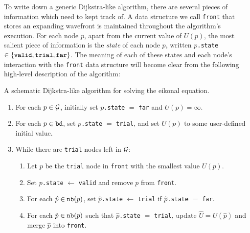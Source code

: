 \documentclass[eikonal.tex]{subfiles}
\begin{document}
To write down a generic Dijkstra-like algorithm, there are several
pieces of information which need to kept track of. A data structure we
call \texttt{front} that stores an expanding wavefront is maintained
throughout the algorithm's execution. For each node $p$, apart from
the current value of $U(p)$, the most salient piece of information is
the \emph{state} of each node $p$, written $p$\texttt{.state}
$\in \left\{\texttt{valid}, \texttt{trial}, \texttt{far}\right\}$. The meaning
of each of these states and each node's interaction with the
\texttt{front} data structure will become clear from the following
high-level description of the algorithm:

\begin{algorithm}
  \caption{A schematic Dijkstra-like algorithm for solving the eikonal
    equation.}\label{alg:dijkstra-like}
  \begin{enumerate}[nolistsep]
  \item For each $p \in \mathcal{G}$, initially set $p$\texttt{.state} $=$
    \texttt{far} and $U(p) = \infty$.
  \item For each $p \in \texttt{bd}$, set $p$\texttt{.state} $=$
    \texttt{trial}, and set $U(p)$ to some user-defined initial value.
  \item While there are \texttt{trial} nodes left in $\mathcal{G}$:
    \begin{enumerate}[nolistsep]
    \item Let $p$ be the \texttt{trial} node in \texttt{front} with
      the smallest value $U(p)$.
    \item Set $p$\texttt{.state} $\gets$ \texttt{valid} and remove $p$
      from \texttt{front}.
    \item For each $\hat{p} \in \texttt{nb}(p)$, set
      $\hat{p}$\texttt{.state} $\gets$ \texttt{trial} if
      $\hat{p}$\texttt{.state} $=$ \texttt{far}.\label{enum:set-trial}
    \item For each $\hat{p} \in \texttt{nb}(p)$ such that
      $\hat{p}$\texttt{.state} $=$ \texttt{trial}, update
      $\hat{U} = U(\hat{p})$ and merge $\hat{p}$ into
      \texttt{front}.\label{enum:update-U}
    \end{enumerate}
  \end{enumerate}
\end{algorithm}
\end{document}
